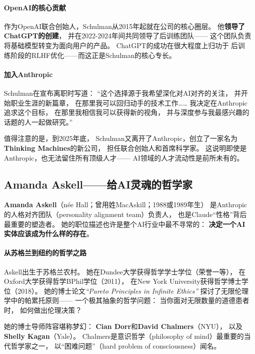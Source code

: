\paragraph{OpenAI的核心贡献}
作为OpenAI联合创始人，Schulman从2015年起就在公司的核心圈层。
他\textbf{领导了ChatGPT的创建}，
并在2022-2024年间共同领导了后训练团队——
这个团队负责将基础模型转变为面向用户的产品。
ChatGPT的成功在很大程度上归功于
后训练阶段的RLHF优化——而这正是Schulman的核心专长。

\paragraph{加入Anthropic}
Schulman在宣布离职时写道：
``这个选择源于我希望深化对AI对齐的关注，
并开始职业生涯的新篇章，
在那里我可以回归动手的技术工作……
我决定在Anthropic追求这个目标，
在那里我相信我可以获得新的视角，
并与深度参与我最感兴趣的话题的人一起做研究。''

值得注意的是，到2025年底，
Schulman又离开了Anthropic，创立了一家名为\textbf{Thinking Machines}的新公司，
担任联合创始人和首席科学家。
这说明即使是Anthropic，也无法留住所有顶级人才——
AI领域的人才流动性是前所未有的。

\subsection{Amanda Askell——给AI灵魂的哲学家}
\label{subsec:askell}

\textbf{Amanda Askell}（née Hall；曾用姓MacAskill；1988或1989年生）
是Anthropic的人格对齐团队（personality alignment team）负责人，
也是Claude``性格''背后最重要的塑造者。
她的职位描述也许是整个AI行业中最不寻常的：
\textbf{决定一个AI实体应该成为什么样的存在}。

\paragraph{从苏格兰到纽约的哲学之路}
Askell出生于苏格兰农村。
她在Dundee大学获得哲学学士学位（荣誉一等），
在Oxford大学获得哲学BPhil学位（2011），
在New York University获得哲学博士学位（2018）。
她的博士论文\textit{``Pareto Principles in Infinite Ethics''}
探讨了无限伦理学中的帕累托原则——
一个极其抽象的哲学问题：
当你面对无限数量的道德患者时，
如何做出伦理决策？

她的博士导师阵容堪称梦幻：
\textbf{Cian Dorr}和\textbf{David Chalmers}（NYU），
以及\textbf{Shelly Kagan}（Yale）。
Chalmers是意识哲学（philosophy of mind）最重要的当代哲学家之一，
以``困难问题''（hard problem of consciousness）闻名。


